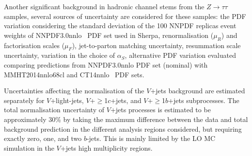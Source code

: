 Another significant background in hadronic channel stems from the $Z\rightarrow \tau\tau$ samples, several sources of uncertainty are
considered for these samples: the PDF variation considering the standard deviation of the 100 NNPDF replicas event weights
of NNPDF3.0nnlo~\cite{Ball:2015NNPDF} PDF
set used in Sherpa, renormalisation ($\mu_{R}$) and factorisation scales ($\mu_{F}$), jet-to-parton matching uncertainty, resummation scale uncertainty,
variation in the choice of $\alpha_{S}$, alternative PDF variation evaluated comparing predictions from NNPDF3.0nnlo PDF set (nominal)
with MMHT2014nnlo68cl and CT14nnlo~\cite{Lai:2010vv,Gao:2013xoa} PDF sets.

Uncertainties affecting the normalisation of the $V$+jets background are estimated separately for $V$+light-jets, $V$+$\geq$1$c$+jets,
and $V$+$\geq$1$b$+jets subprocesses. The total normalisation uncertainty of $V$+jets processes is estimated to be approximately 30\% by taking the maximum
difference between the data and total background prediction in the different analysis regions considered, but requiring exactly zero, one, and two $b$-jets.
This is mainly limited by the LO MC simulation in the $V$+jets high multiplicity regions.  


